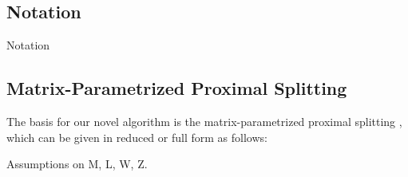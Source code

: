 \subsection{Notation}
Notation

\subsection{Matrix-Parametrized Proximal Splitting}
The basis for our novel algorithm is the matrix-parametrized proximal splitting \cite{bassett2024optimaldesignresolventsplitting}, which can be given in reduced or full form as follows:

Assumptions on M, L, W, Z.

